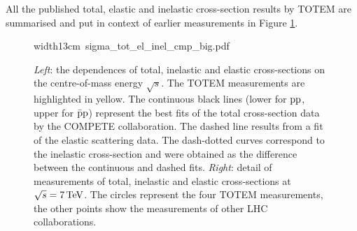 \documentclass{desyproc}
\def\un#1{\,{\rm #1}}
\begin{document}
All the published total, elastic and inelastic cross-section results by TOTEM are summarised and put in context of earlier measurements in Figure \ref{fig:sigmas}.

\begin{figure}
\begin{center}
\leavevmode
\hbox{\pdfximage width13cm {sigma_tot_el_inel_cmp_big.pdf}\pdfrefximage\pdflastximage}
\caption{%
{\em Left}: the dependences of total, inelastic and elastic cross-sections on the centre-of-mass energy $\sqrt s$. The TOTEM measurements are highlighted in yellow. The continuous black lines (lower for $\rm pp$, upper for $\rm \bar pp$) represent the best fits of the total cross-section data by the COMPETE collaboration. The dashed line results from a fit of the elastic scattering data. The dash-dotted curves correspond to the inelastic cross-section and were obtained as the difference between the continuous and dashed fits.\hfil\break
{\em Right}: detail of measurements of total, inelastic and elastic cross-sections at $\sqrt s = 7\un{TeV}$. The circles represent the four TOTEM measurements, the other points show the measurements of other LHC collaborations.
}
\label{fig:sigmas}
\end{center}
\end{figure}





 

\def\Name#1{#1,}
\def\Review#1#2#3#4{#1 {\bf#2} #4 (#3)}
\end{document}
